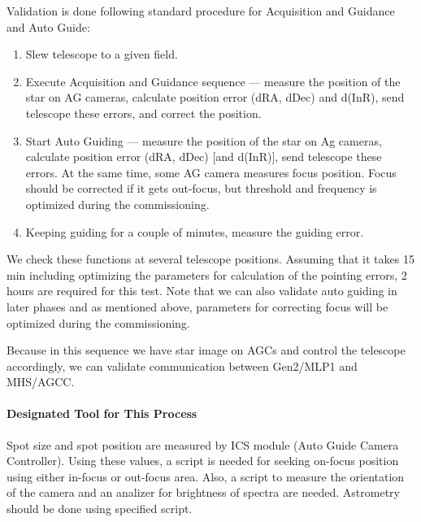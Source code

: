 Validation is done following standard procedure for Acquisition and Guidance and Auto Guide:
\begin{enumerate}
\item Slew telescope to a given field.
\item Execute Acquisition and Guidance sequence --- measure the position of the star on AG cameras, calculate position error (dRA, dDec) and d(InR), send telescope these errors, and correct the position.
\item Start Auto Guiding --- measure the position of the star on Ag cameras, calculate position error (dRA, dDec) [and d(InR)], send telescope these errors.
At the same time, some AG camera measures focus position.
Focus should be corrected if it gets out-focus, but threshold and frequency is optimized during the commissioning.
\item Keeping guiding for a couple of minutes, measure the guiding error.
\end{enumerate}


We check these functions at several telescope positions.
Assuming that it takes 15 min including optimizing the parameters for calculation of the pointing errors, 2 hours are required for this test.
Note that we can also validate auto guiding in later phases and as mentioned above, parameters for correcting focus will be optimized during the commissioning.

\smallskip

Because in this sequence we have star image on AGCs  and control the telescope accordingly, we can validate communication between Gen2/MLP1 and MHS/AGCC.

\paragraph{Designated Tool for This Process}
Spot size and spot position are measured by ICS module (Auto Guide Camera Controller).
Using these values, a script is needed for seeking on-focus position using either in-focus or out-focus area.
Also, a script to measure the orientation of the camera and an analizer for brightness of spectra are needed.
Astrometry should be done using specified script.


